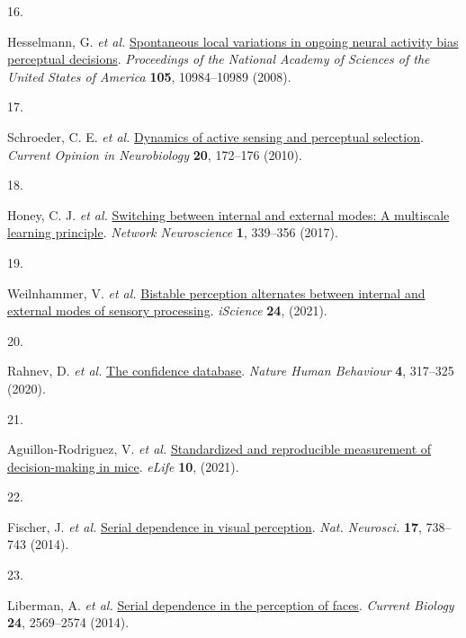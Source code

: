 \documentclass[
]{article}
\newlength{\cslhangindent}
\newlength{\csllabelwidth}
\newlength{\cslentryspacingunit} %
\newenvironment{CSLReferences}[2] %
 {%
  \setlength{\parindent}{0pt}
  \ifodd #1
  \let\oldpar\par
  \def\par{\hangindent=\cslhangindent\oldpar}
  \fi
  \setlength{\parskip}{#2\cslentryspacingunit}
 }%
 {}
\newcommand{\CSLLeftMargin}[1]{\parbox[t]{\csllabelwidth}{#1}}
\newcommand{\CSLRightInline}[1]{\parbox[t]{\linewidth - \csllabelwidth}{#1}\break}
\begin{document}
\begin{CSLReferences}{0}{0}
\leavevmode{}%
\CSLLeftMargin{16. }%
\CSLRightInline{Hesselmann, G. \emph{et al.}
\href{https://doi.org/10.1073/pnas.0712043105}{Spontaneous local
variations in ongoing neural activity bias perceptual decisions}.
\emph{Proceedings of the National Academy of Sciences of the United
States of America} \textbf{105}, 10984--10989 (2008).}

\leavevmode{}%
\CSLLeftMargin{17. }%
\CSLRightInline{Schroeder, C. E. \emph{et al.}
\href{https://doi.org/10.1016/j.conb.2010.02.010}{Dynamics of active
sensing and perceptual selection}. \emph{Current Opinion in
Neurobiology} \textbf{20}, 172--176 (2010).}

\leavevmode{}%
\CSLLeftMargin{18. }%
\CSLRightInline{Honey, C. J. \emph{et al.}
\href{https://doi.org/10.1162/netn_a_00024}{Switching between internal
and external modes: A multiscale learning principle}. \emph{Network
Neuroscience} \textbf{1}, 339--356 (2017).}

\leavevmode{}%
\CSLLeftMargin{19. }%
\CSLRightInline{Weilnhammer, V. \emph{et al.}
\href{https://doi.org/10.1016/j.isci.2021.102234}{Bistable perception
alternates between internal and external modes of sensory processing}.
\emph{iScience} \textbf{24}, (2021).}

\leavevmode{}%
\CSLLeftMargin{20. }%
\CSLRightInline{Rahnev, D. \emph{et al.}
\href{https://doi.org/10.1038/s41562-019-0813-1}{The confidence
database}. \emph{Nature Human Behaviour} \textbf{4}, 317--325 (2020).}

\leavevmode{}%
\CSLLeftMargin{21. }%
\CSLRightInline{Aguillon-Rodriguez, V. \emph{et al.}
\href{https://doi.org/10.7554/ELIFE.63711}{Standardized and reproducible
measurement of decision-making in mice}. \emph{eLife} \textbf{10},
(2021).}

\leavevmode{}%
\CSLLeftMargin{22. }%
\CSLRightInline{Fischer, J. \emph{et al.}
\href{https://doi.org/10.1038/nn.3689}{Serial dependence in visual
perception}. \emph{Nat. Neurosci.} \textbf{17}, 738--743 (2014).}

\leavevmode{}%
\CSLLeftMargin{23. }%
\CSLRightInline{Liberman, A. \emph{et al.}
\href{https://doi.org/10.1016/j.cub.2014.09.025}{Serial dependence in
the perception of faces}. \emph{Current Biology} \textbf{24}, 2569--2574
(2014).}


\end{CSLReferences}
\end{document}
